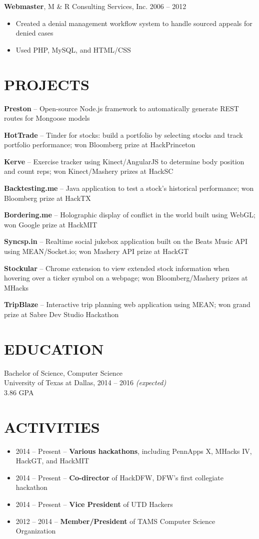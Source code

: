 \documentclass{res} %
\begin{document}
{\bf Webmaster}, M \& R Consulting Services, Inc. \hfill 2006 -- 2012
\begin{itemize} \itemsep -2pt
  \item Created a denial management workflow system to handle sourced appeals for denied cases
  \item Used PHP, MySQL, and HTML/CSS
\end{itemize} 

\section{PROJECTS}

\textbf{Preston} -- Open-source Node.js framework to automatically generate REST routes for Mongoose models

\textbf{HotTrade} -- Tinder for stocks: build a portfolio by selecting stocks and track portfolio performance; won Bloomberg prize at HackPrinceton

\textbf{Kerve} -- Exercise tracker using Kinect/AngularJS to determine body position and count reps; won Kinect/Mashery prizes at HackSC

\textbf{Backtesting.me} -- Java application to test a stock's historical performance; won Bloomberg prize at HackTX

\textbf{Bordering.me} -- Holographic display of conflict in the world built using WebGL; won Google prize at HackMIT

\textbf{Syncsp.in} -- Realtime social jukebox application built on the Beats Music API using MEAN/Socket.io; won Mashery API prize at HackGT

\textbf{Stockular} -- Chrome extension to view extended stock information when hovering over a ticker symbol on a webpage; won Bloomberg/Mashery prizes at MHacks

\textbf{TripBlaze} -- Interactive trip planning web application using MEAN; won grand prize at Sabre Dev Studio Hackathon

\section{EDUCATION}

Bachelor of Science, Computer Science \\
University of Texas at Dallas, 2014 -- 2016 \textit {(expected)} \\
3.86 GPA

\section{ACTIVITIES} 

\begin{itemize} \itemsep -2pt
  \item 2014 -- Present -- \textbf{Various hackathons}, including PennApps X, MHacks IV, HackGT, and HackMIT
  \item 2014 -- Present -- \textbf{Co-director} of HackDFW, DFW's first collegiate hackathon
  \item 2014 -- Present -- \textbf{Vice President} of UTD Hackers
  \item 2012 -- 2014 -- \textbf{Member/President} of TAMS Computer Science Organization
\end{itemize}
\end{document}
